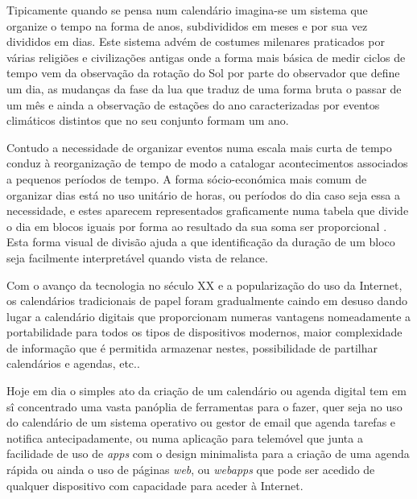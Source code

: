 \documentclass[11pt, twoside]{report}
\begin{document}
	Tipicamente quando se pensa num calendário imagina-se um sistema que organize o tempo na forma de anos, subdivididos em meses e por sua vez divididos em dias.
	Este sistema advém de costumes milenares praticados por várias religiões e civilizações antigas onde a forma mais básica de medir ciclos de tempo vem da observação da rotação do Sol por parte do observador que define um dia, as mudanças da fase da lua que traduz de uma forma bruta o passar de um mês e ainda a observação de estações do ano caracterizadas por eventos climáticos distintos que no seu conjunto formam um ano\cite{stray_mayan_2007}.
	
	Contudo a necessidade de organizar eventos numa escala mais curta de tempo conduz à reorganização de tempo de modo a catalogar acontecimentos associados a pequenos períodos de tempo. 
	A forma sócio-económica mais comum de organizar dias está no uso unitário de horas, ou períodos do dia caso seja essa a necessidade, e estes aparecem representados graficamente numa tabela\cite{10.1145/2702613.2732512} que divide o dia em blocos iguais por forma ao resultado da sua soma ser proporcional \cite{Russell1910-RUSPMV}. 
	Esta forma visual de divisão ajuda a que identificação da duração de um bloco seja facilmente interpretável quando vista de relance. 
	
	Com o avanço da tecnologia no século XX e a popularização do uso da Internet, os calendários tradicionais de papel foram gradualmente caindo em desuso dando lugar a calendário digitais que proporcionam numeras vantagens nomeadamente a portabilidade para todos os tipos de dispositivos modernos, maior complexidade de informação que é permitida armazenar nestes, possibilidade de partilhar calendários e agendas, etc.. 
	
	Hoje em dia o simples ato da criação de um calendário ou agenda digital tem em sî concentrado uma vasta panóplia de ferramentas para o fazer, quer seja no uso do calendário de um sistema operativo ou gestor de email que agenda tarefas e notifica antecipadamente, ou numa aplicação para telemóvel que junta a facilidade de uso de \textit{apps} com o design minimalista para a criação de uma agenda rápida ou ainda o uso de páginas \textit{web}, ou \textit{webapps} que pode ser acedido de qualquer dispositivo com capacidade para aceder à Internet. 
	
\end{document}
